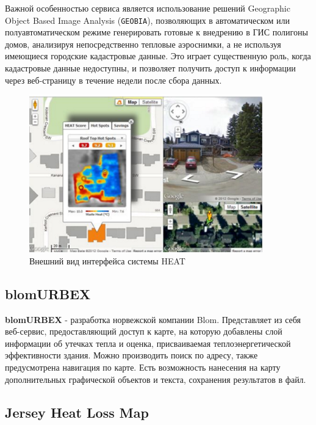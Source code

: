 	Важной особенностью сервиса является использование решений Geographic Object Based Image Analysis (\texttt{GEOBIA}), позволяющих в автоматическом или полуавтоматическом режиме генерировать готовые к внедрению в ГИС полигоны домов, анализируя непосредственно тепловые аэроснимки, а не используя имеющиеся городские кадастровые данные. Это играет существенную роль, когда кадастровые данные недоступны, и позволяет получить доступ к информации через веб-страницу в течение недели после сбора данных.

	\begin{figure}[h!]
      \centering
      \includegraphics[width=0.9\textwidth]{images/screens/2_heat.png}
      \caption{Внешний вид интерфейса системы HEAT}
      \label{screens:heat}
    \end{figure}

\subsection{blomURBEX}

\par
	\textbf{blomURBEX} - разработка норвежской компании Blom. Представляет из себя веб-сервис, предоставляющий доступ к карте, на которую добавлены слой информации об утечках тепла и оценка, присваиваемая теплоэнергетической эффективности здания. Можно производить поиск по адресу, также предусмотрена навигация по карте. Есть возможность нанесения на карту дополнительных графической объектов и текста, сохранения результатов в файл.

\subsection{Jersey Heat Loss Map}

